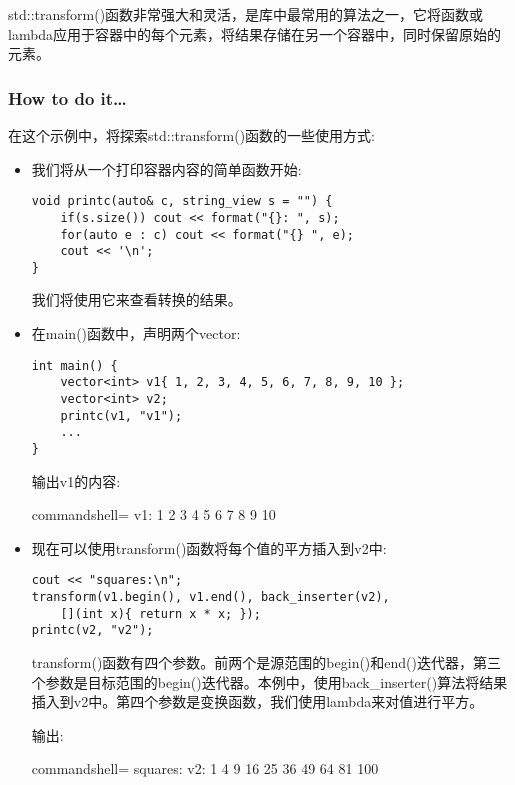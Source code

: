 
std::transform()函数非常强大和灵活，是库中最常用的算法之一，它将函数或lambda应用于容器中的每个元素，将结果存储在另一个容器中，同时保留原始的元素。

\subsubsection{How to do it…}

在这个示例中，将探索std::transform()函数的一些使用方式:

\begin{itemize}
\item 
我们将从一个打印容器内容的简单函数开始:

\begin{lstlisting}[style=styleCXX]
void printc(auto& c, string_view s = "") {
	if(s.size()) cout << format("{}: ", s);
	for(auto e : c) cout << format("{} ", e);
	cout << '\n';
}
\end{lstlisting}

我们将使用它来查看转换的结果。

\item 
在main()函数中，声明两个vector:

\begin{lstlisting}[style=styleCXX]
int main() {
	vector<int> v1{ 1, 2, 3, 4, 5, 6, 7, 8, 9, 10 };
	vector<int> v2;
	printc(v1, "v1");
	...
}
\end{lstlisting}

输出v1的内容:

\begin{tcblisting}{commandshell={}}
v1: 1 2 3 4 5 6 7 8 9 10
\end{tcblisting}

\item 
现在可以使用transform()函数将每个值的平方插入到v2中:

\begin{lstlisting}[style=styleCXX]
cout << "squares:\n";
transform(v1.begin(), v1.end(), back_inserter(v2),
	[](int x){ return x * x; });
printc(v2, "v2");
\end{lstlisting}

transform()函数有四个参数。前两个是源范围的begin()和end()迭代器，第三个参数是目标范围的begin()迭代器。本例中，使用back\_inserter()算法将结果插入到v2中。第四个参数是变换函数，我们使用lambda来对值进行平方。

输出:

\begin{tcblisting}{commandshell={}}
squares:
v2: 1 4 9 16 25 36 49 64 81 100
\end{tcblisting}


\end{itemize}
